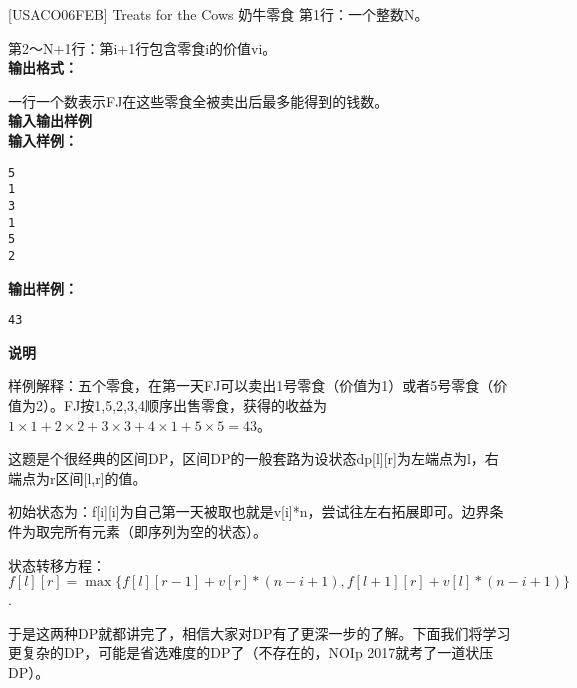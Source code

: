 \begin{example}{[USACO06FEB] Treats for the Cows 奶牛零食}
	第1行：一个整数N。

	第2～N+1行：第i+1行包含零食i的价值vi。\\
	\textbf{输出格式：}

	一行一个数表示FJ在这些零食全被卖出后最多能得到的钱数。\\
	\textbf{输入输出样例}\\
	\textbf{输入样例：}

	\begin{verbatim}
5
1
3
1
5
2
\end{verbatim}
	\textbf{输出样例：}
	\begin{verbatim} 
43
\end{verbatim}
	\textbf{说明}

	样例解释：五个零食，在第一天FJ可以卖出1号零食（价值为1）或者5号零食（价值为2）。FJ按1,5,2,3,4顺序出售零食，获得的收益为$1\times 1+2\times 2+3\times 3+4\times 1+5\times 5=43$。
\end{example}

这题是个很经典的区间DP，区间DP的一般套路为设状态dp[l][r]为左端点为l，右端点为r区间[l,r]的值。

初始状态为：f[i][i]为自己第一天被取也就是v[i]*n，尝试往左右拓展即可。边界条件为取完所有元素（即序列为空的状态）。

状态转移方程：$f[l][r]=\max\{f[l][r-1]+v[r]*(n-i+1),f[l+1][r]+v[l]*(n-i+1)\}$.
\ \\ \par
于是这两种DP就都讲完了，相信大家对DP有了更深一步的了解。下面我们将学习更复杂的DP，可能是省选难度的DP了（不存在的，NOIp 2017就考了一道状压DP）。

\note
